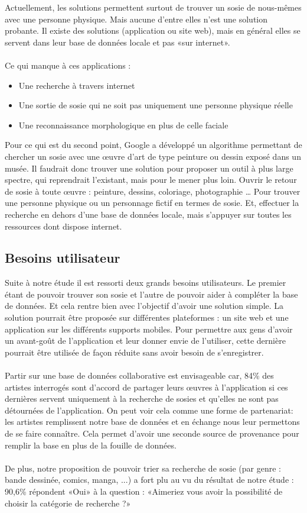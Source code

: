 \documentclass[a4paper,12pt]{article}
\begin{document}
Actuellement, les solutions permettent surtout de trouver un sosie de nous-mêmes avec une personne physique. Mais aucune d'entre elles n'est une solution probante. Il existe des solutions (application ou site web), mais en général elles se servent dans leur base de données locale et pas «sur internet». \\ \\
Ce qui manque à ces applications : 
\begin{itemize}
    \item Une recherche à travers internet 
    \item Une sortie de sosie qui ne soit pas uniquement une personne physique réelle 
    \item Une reconnaissance morphologique en plus de celle faciale \\
\end{itemize}
Pour ce qui est du second point, Google a développé un algorithme permettant de chercher un sosie avec une œuvre d’art de type peinture ou dessin exposé dans un musée. Il faudrait donc trouver une solution pour proposer un outil à plus large spectre, qui reprendrait l’existant, mais pour le mener plus loin. 
Ouvrir le retour de sosie à toute œuvre : peinture, dessins, coloriage, photographie … Pour trouver une personne physique ou un personnage fictif en termes de sosie. Et, effectuer la recherche en dehors d'une base de données locale, mais s'appuyer sur toutes les ressources dont dispose internet. 

\subsection{Besoins utilisateur}
Suite à notre étude il est ressorti deux grands besoins utilisateurs. Le premier étant de pouvoir trouver son sosie et l'autre de pouvoir aider à compléter la base de données. Et cela rentre bien avec l'objectif d'avoir une solution simple. La solution pourrait être proposée sur différentes plateformes : un site web et une application sur les différents supports mobiles. Pour permettre aux gens d'avoir un avant-goût de l'application et leur donner envie de l'utiliser, cette dernière pourrait être utilisée de façon réduite sans avoir besoin de s'enregistrer. \\
\\ Partir sur une base de données collaborative est envisageable car, 84\% des artistes interrogés sont d'accord de partager leurs œuvres à l'application si ces dernières servent uniquement à la recherche de sosies et qu'elles ne sont pas détournées de l'application. On peut voir cela comme une forme de partenariat: les artistes remplissent notre base de données et en échange nous leur permettons de se faire connaître. Cela permet d'avoir une seconde source de provenance pour remplir la base en plus de la fouille de données. \\
\\De plus, notre proposition de pouvoir trier sa recherche de sosie (par genre : bande dessinée, comics, manga, ...) a fort plu au vu du résultat de notre étude : 90,6\% répondent «Oui» à la question : «Aimeriez vous avoir la possibilité de choisir la catégorie de recherche ?»  
\end{document}
